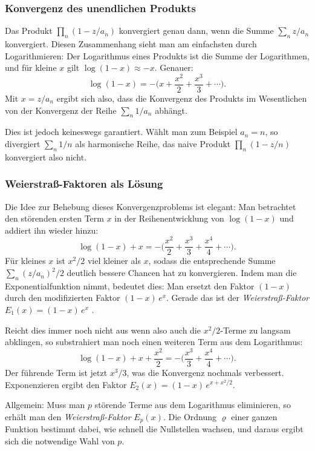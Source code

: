 \subsubsection{Konvergenz des unendlichen Produkts}
Das Produkt $\prod_n (1 - z/a_n)$ konvergiert genau dann, wenn die Summe
$\sum_n z/a_n$ konvergiert. Diesen Zusammenhang sieht man am einfachsten durch
Logarithmieren: Der Logarithmus eines Produkts ist die Summe der Logarithmen,
und für kleine $x$ gilt $\log(1 - x) \approx -x$. Genauer:
\[
\log(1 - x)
=
-\biggl(x + \frac{x^2}{2} + \frac{x^3}{3} + \cdots\biggr).
\]
Mit $x = z/a_n$ ergibt sich also, dass die Konvergenz des Produkts im Wesentlichen
von der Konvergenz der Reihe $\sum_n 1/a_n$ abhängt.

Dies ist jedoch keineswegs garantiert. Wählt man zum Beispiel $a_n = n$,
so divergiert $\sum_n 1/n$ als harmonische Reihe, das naive Produkt
$\prod_n (1 - z/n)$ konvergiert also nicht.

\subsubsection{Weierstraß-Faktoren als Lösung}
Die Idee zur Behebung dieses Konvergenzproblems ist elegant: Man betrachtet
den störenden ersten Term $x$ in der Reihenentwicklung von $\log(1-x)$ und
addiert ihn wieder hinzu:
\[
\log(1 - x) + x
=
-\biggl(\frac{x^2}{2} + \frac{x^3}{3} + \frac{x^4}{4} + \cdots\biggr).
\]
Für kleines $x$ ist $x^2/2$ viel kleiner als $x$, sodass die entsprechende Summe
$\sum_n (z/a_n)^2/2$ deutlich bessere Chancen hat zu konvergieren.
Indem man die Exponentialfunktion nimmt, bedeutet dies: Man ersetzt den Faktor
$(1 - x)$ durch den modifizierten Faktor $(1-x)\,e^{x}$. Gerade das ist der
\emph{Weierstraß-Faktor} $E_1(x) = (1-x)\,e^{x}$  \cite{produkt:weierstrass}.

Reicht dies immer noch nicht aus wenn also auch die $x^2/2$-Terme zu langsam
abklingen, so substrahiert man noch einen weiteren Term aus dem Logarithmus:
\[
\log(1-x) + x + \frac{x^2}{2}
=
-\biggl(\frac{x^3}{3} + \frac{x^4}{4} + \cdots\biggr).
\]
Der führende Term ist jetzt $x^3/3$, was die Konvergenz nochmals verbessert.
Exponenzieren ergibt den Faktor $E_2(x) = (1-x)\,e^{x + x^2/2}$.

Allgemein: Muss man $p$ störende Terme aus dem Logarithmus eliminieren, so
erhält man den \emph{Weierstraß-Faktor} $E_p(x)$.
%
%
%
Die Ordnung $\varrho$ einer ganzen Funktion bestimmt dabei, wie schnell die
Nullstellen wachsen, und daraus ergibt sich die notwendige Wahl von $p$.

